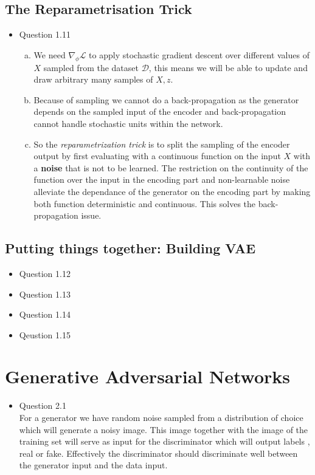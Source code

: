 \documentclass{article}
\begin{document}
  \subsection{The Reparametrisation Trick}
    \begin{itemize}
      \item Question 1.11
      \begin{enumerate}[(a)]
        \item We need $\nabla_{\phi} \mathcal{L}$ to apply stochastic gradient descent over different values of $X$ sampled from the dataset $\mathcal{D}$, this means we will be able to update and draw arbitrary many samples of $X, z$. 
        \item Because of sampling we cannot do a back-propagation as the generator depends on the sampled input of the encoder and back-propagation cannot handle stochastic units within the network. 
        \item So the \textit{reparametrization trick} is to split the sampling of the encoder output by first evaluating with a continuous function on the input $X$ with a \textbf{noise} that is not to be learned. The restriction on the continuity of the function over the input in the encoding part and non-learnable noise alleviate the dependance of the generator on the encoding part by making both function deterministic and continuous. This solves the back-propagation issue. 
      \end{enumerate}
    \end{itemize}
  \subsection{Putting things together: Building VAE}
    \begin{itemize}
      \item Question 1.12
      \item Question 1.13
      \item Question 1.14
      \item Qeustion 1.15
    \end{itemize}
\section{Generative Adversarial Networks}
    \begin{itemize}
      \item Question 2.1 \\
      For a generator we have random noise sampled from a distribution of choice which will generate a noisy image. This image together with the image of the training set will serve as input for the discriminator which will output labels , real or fake. Effectively the discriminator should discriminate well between the generator input and the data input. 
    \end{itemize}
\end{document}
